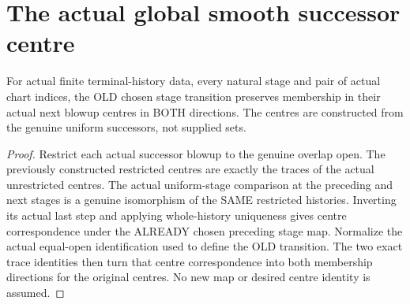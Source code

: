\section{The actual global smooth successor centre}

\begin{theorem}
\label{hir:sharp-actual-curve-successor-centre-transition}
\leanok
For actual finite terminal-history data, every natural stage and pair of
actual chart indices, the OLD chosen stage transition preserves membership
in their actual next blowup centres in BOTH directions. The centres are
constructed from the genuine uniform successors, not supplied sets.
\end{theorem}
\begin{proof}
Restrict each actual successor blowup to the genuine overlap open. The
previously constructed restricted centres are exactly the traces of the
actual unrestricted centres. The actual uniform-stage comparison at the
preceding and next stages is a genuine isomorphism of the SAME restricted
histories. Inverting its actual last step and applying whole-history
uniqueness gives centre correspondence under the ALREADY chosen preceding
stage map. Normalize the actual equal-open identification used to define
the OLD transition. The two exact trace identities then turn that centre
correspondence into both membership directions for the original centres.
No new map or desired centre identity is assumed.
\end{proof}

